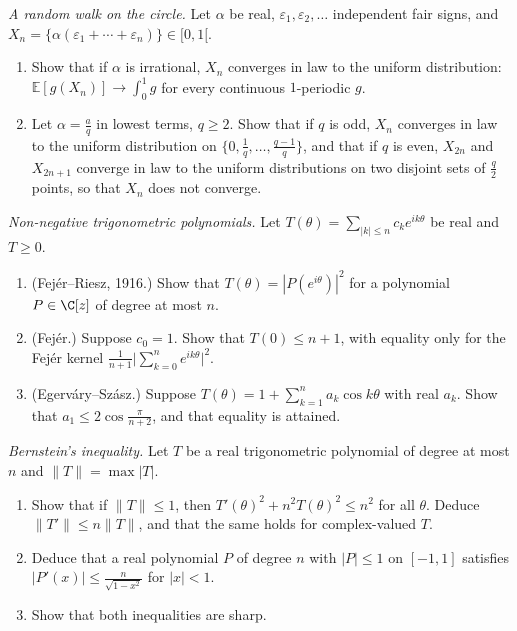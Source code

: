 \begin{exercise}[$\star\star$]\label{pb:circlewalk}
\emph{A random walk on the circle.} Let $\alpha$ be real, $\varepsilon_1,\varepsilon_2,\dots$ independent fair signs, and
$X_n=\{\alpha(\varepsilon_1+\cdots+\varepsilon_n)\}\in[0,1[$.
\begin{enumerate}[label=(\alph*)]
\item Show that if $\alpha$ is irrational, $X_n$ converges in law to the uniform distribution: $\mathbb E[g(X_n)]\to\int_0^1g$ for every
continuous $1$-periodic $g$.
\item Let $\alpha=\frac aq$ in lowest terms, $q\ge2$. Show that if $q$ is odd, $X_n$ converges in law to the uniform distribution on
$\{0,\frac1q,\dots,\frac{q-1}q\}$, and that if $q$ is even, $X_{2n}$ and $X_{2n+1}$ converge in law to the uniform distributions on two
disjoint sets of $\frac q2$ points, so that $X_n$ does not converge.
\end{enumerate}
\end{exercise}

\begin{exercise}[$\star\star\star$]\label{pb:fejer}
\emph{Non-negative trigonometric polynomials.} Let $T(\theta)=\sum_{|k|\le n}c_ke^{ik\theta}$ be real and $T\ge0$.
\begin{enumerate}[label=(\alph*)]
\item (Fejér--Riesz, 1916.) Show that $T(\theta)=|P(e^{i\theta})|^2$ for a polynomial $P\in\C[z]$ of degree at most $n$.
\item (Fejér.) Suppose $c_0=1$. Show that $T(0)\le n+1$, with equality only for the Fejér kernel $\frac1{n+1}\bigl|\sum_{k=0}^ne^{ik\theta}\bigr|^2$.
\item (Egerváry--Szász.) Suppose $T(\theta)=1+\sum_{k=1}^na_k\cos k\theta$ with real $a_k$. Show that $a_1\le2\cos\frac\pi{n+2}$, and that equality is
attained.
\end{enumerate}
\end{exercise}

\begin{exercise}[$\star\star\star$]\label{pb:bernstein}
\emph{Bernstein's inequality.} Let $T$ be a real trigonometric polynomial of degree at most $n$ and $\|T\|=\max|T|$.
\begin{enumerate}[label=(\alph*)]
\item Show that if $\|T\|\le1$, then $T'(\theta)^2+n^2T(\theta)^2\le n^2$ for all $\theta$. Deduce $\|T'\|\le n\|T\|$, and that the same holds for
complex-valued $T$.
\item Deduce that a real polynomial $P$ of degree $n$ with $|P|\le1$ on $[-1,1]$ satisfies $|P'(x)|\le\frac n{\sqrt{1-x^2}}$ for $|x|<1$.
\item Show that both inequalities are sharp.
\end{enumerate}
\end{exercise}

